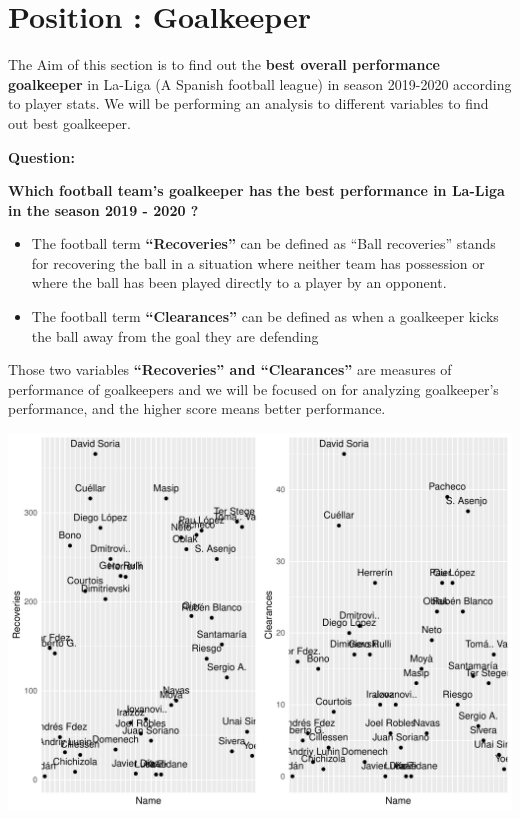 \documentclass[11pt,a4paper,]{article}
\let\origfigure\figure
\let\endorigfigure\endfigure
\renewenvironment{figure}[1][2] {
    \expandafter\origfigure\expandafter[H]
} {
    \endorigfigure
}
\begin{document}
\hypertarget{position-goalkeeper}{%
\section{Position : Goalkeeper}\label{position-goalkeeper}}

The Aim of this section is to find out the \textbf{best overall performance goalkeeper} in La-Liga (A Spanish football league) in season 2019-2020 according to player stats. We will be performing an analysis to different variables to find out best goalkeeper.

\textbf{Question:}

\textbf{Which football team's goalkeeper has the best performance in La-Liga in the season 2019 - 2020 ?}

\begin{itemize}
\item
  The football term \textbf{``Recoveries''} can be defined as ``Ball recoveries'' stands for recovering the ball in a situation where neither team has possession or where the ball has been played directly to a player by an opponent.
\item
  The football term \textbf{``Clearances''} can be defined as when a goalkeeper kicks the ball away from the goal they are defending
\end{itemize}

Those two variables \textbf{``Recoveries'' and ``Clearances''} are measures of performance of goalkeepers and we will be focused on for analyzing goalkeeper's performance, and the higher score means better performance.

\begin{figure}[H]

{\centering \includegraphics[width=0.8\linewidth]{Assignment-4-ETC5513_files/figure-latex/graph-data-1} 

}

\caption{Recoveries and Clearances}\label{fig:graph-data}
\end{figure}
\end{document}
